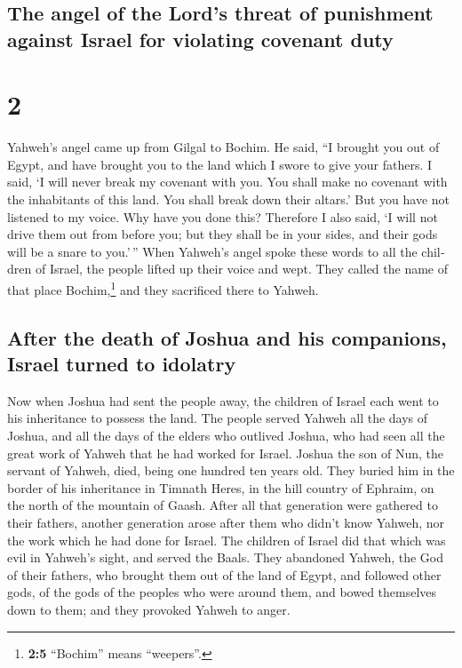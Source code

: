 \begin{paracol}{2}
\begin{otherlanguage}{english}
\hypertarget{the-angel-of-the-lords-threat-of-punishment-against-israel-for-violating-covenant-duty}{%
\subsection{The angel of the Lord's threat of punishment against Israel
for violating covenant
duty}\label{the-angel-of-the-lords-threat-of-punishment-against-israel-for-violating-covenant-duty}}

\hypertarget{section-3}{%
\section{2}\label{section-3}}

 Yahweh's angel came up from Gilgal to Bochim. He said,
``I brought you out of Egypt, and have brought you to the land which I
swore to give your fathers. I said, `I will never break my covenant with
you.  You shall make no covenant with the inhabitants of
this land. You shall break down their altars.' But you have not listened
to my voice. Why have you done this?  Therefore I also
said, `I will not drive them out from before you; but they shall be in
your sides, and their gods will be a snare to you.'\,'' 
When Yahweh's angel spoke these words to all the children of Israel, the
people lifted up their voice and wept.  They called the
name of that place Bochim,\footnote{\textbf{2:5} ``Bochim'' means
  ``weepers''.} and they sacrificed there to Yahweh.

\hypertarget{after-the-death-of-joshua-and-his-companions-israel-turned-to-idolatry}{%
\subsection{After the death of Joshua and his companions, Israel turned
to
idolatry}\label{after-the-death-of-joshua-and-his-companions-israel-turned-to-idolatry}}

 Now when Joshua had sent the people away, the children of
Israel each went to his inheritance to possess the land. 
The people served Yahweh all the days of Joshua, and all the days of the
elders who outlived Joshua, who had seen all the great work of Yahweh
that he had worked for Israel.  Joshua the son of Nun, the
servant of Yahweh, died, being one hundred ten years old. 
They buried him in the border of his inheritance in Timnath Heres, in
the hill country of Ephraim, on the north of the mountain of Gaash.
 After all that generation were gathered to their
fathers, another generation arose after them who didn't know Yahweh, nor
the work which he had done for Israel.  The children of
Israel did that which was evil in Yahweh's sight, and served the Baals.
 They abandoned Yahweh, the God of their fathers, who
brought them out of the land of Egypt, and followed other gods, of the
gods of the peoples who were around them, and bowed themselves down to
them; and they provoked Yahweh to anger.


\end{otherlanguage}
\end{paracol}
